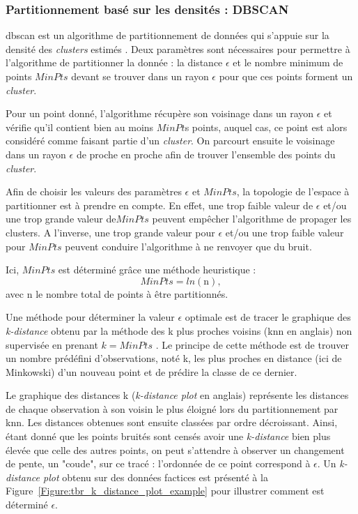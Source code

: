 \subsubsection{Partitionnement basé sur les densités : DBSCAN}
\gls{dbscan} est un algorithme de partitionnement de données qui s'appuie sur la densité des \textit{clusters} estimés \citep{Ester1996}. 
Deux paramètres sont nécessaires pour permettre à l'algorithme de partitionner la donnée : la distance $\epsilon$ et le nombre minimum de points 
$MinPts$ devant se trouver dans un rayon $\epsilon$ pour que ces points forment un \textit{cluster}.
 
Pour un point donné, l'algorithme récupère son voisinage dans un rayon $\epsilon$ et vérifie qu'il contient bien au moins $MinPt$s points, auquel cas, 
ce point est alors considéré comme faisant partie d'un \textit{cluster}. On parcourt ensuite le voisinage 
dans un rayon $\epsilon$ de proche en proche afin de trouver l'ensemble des points du \textit{cluster}.

Afin de choisir les valeurs des paramètres $\epsilon$ et $MinPts$, la topologie de l'espace à partitionner est à prendre en compte. En effet, une 
trop faible valeur de $\epsilon$  et/ou une trop grande valeur de$MinPts$ peuvent empêcher 
l'algorithme de propager les clusters. A l'inverse, une trop grande valeur pour $\epsilon$  
et/ou une trop faible valeur pour $MinPts$ peuvent conduire l'algorithme à ne renvoyer que du bruit. 
 
Ici, $MinPts$ est déterminé grâce une méthode heuristique \citep{Birant2007} :
\begin{equation}
\label{eq:tbr_dbscan}
MinPts = ln(\text{n}),
\end{equation}
avec n le nombre total de points à être partitionnés.

Une méthode pour déterminer la valeur $\epsilon$ optimale est de tracer le graphique des \textit{k-distance} obtenu par la méthode des k plus proches voisins 
(\gls{knn} en anglais) non supervisée en prenant $k = MinPts$ \citep{James2013, Goldberger2005, Ester1996}. Le principe de cette méthode
est de trouver un nombre prédéfini d'observations, noté k, les plus proches en distance (ici de Minkowski) d'un nouveau point et de prédire la classe de ce dernier. 

Le graphique des distances k (\textit{k-distance plot} en anglais) représente les distances de chaque observation à son voisin le plus éloigné 
lors du partitionnement par \gls{knn}. Les distances obtenues sont ensuite classées par ordre décroissant. 
Ainsi, étant donné que les points bruités sont censés avoir une \textit{k-distance} bien plus élevée que celle des autres points, on peut 
s'attendre à observer un changement de pente, un "coude", sur ce tracé : l'ordonnée de ce point correspond à $\epsilon$. Un \textit{k-distance plot}
obtenu sur des données factices est présenté à la Figure~\ref{Figure:tbr_k_distance_plot_example} pour illustrer comment est déterminé $\epsilon$. 

